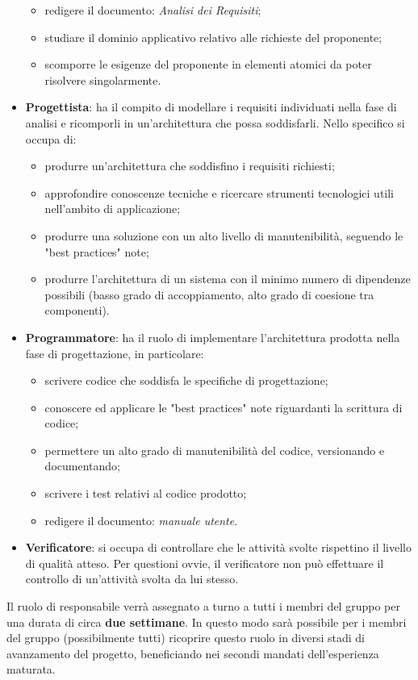 \begin{itemize}
\begin{itemize}
    \item redigere il documento: \textit{Analisi dei Requisiti};
    \item studiare il dominio applicativo relativo alle richieste del proponente;
    \item scomporre le esigenze del proponente in elementi atomici da poter risolvere singolarmente.
  \end{itemize}
  \item \textbf{Progettista}: ha il compito di modellare i requisiti individuati nella fase di analisi e ricomporli in un'architettura che possa soddisfarli. Nello specifico si occupa di:
  \begin{itemize}
    \item produrre un'architettura che soddisfino i requisiti richiesti;
    \item approfondire conoscenze tecniche e ricercare strumenti tecnologici utili nell'ambito di applicazione;
    \item produrre una soluzione con un alto livello di manutenibilità, seguendo le "best practices" note;
    \item produrre l'architettura di un sistema con il minimo numero di dipendenze possibili (basso grado di accoppiamento, alto grado di coesione tra componenti).
  \end{itemize}
  \item \textbf{Programmatore}: ha il ruolo di implementare l'architettura prodotta nella fase di progettazione, in particolare:
  \begin{itemize}
    \item scrivere codice che soddisfa le specifiche di progettazione;
    \item conoscere ed applicare le "best practices" note riguardanti la scrittura di codice;
    \item permettere un alto grado di manutenibilità del codice, versionando e documentando;
    \item scrivere i test relativi al codice prodotto;
    \item redigere il documento: \textit{manuale utente}.
  \end{itemize}
  \item \textbf{Verificatore}: si occupa di controllare che le attività svolte rispettino il livello di qualità atteso. Per questioni ovvie, il verificatore non può effettuare il controllo di un'attività svolta da lui stesso.
\end{itemize}

Il ruolo di responsabile verrà assegnato a turno a tutti i membri del gruppo per una durata di circa \textbf{due settimane}. In questo modo sarà possibile per i membri del gruppo (possibilmente tutti) ricoprire questo ruolo in diversi stadi di avanzamento del progetto, beneficiando nei secondi mandati dell'esperienza maturata.

